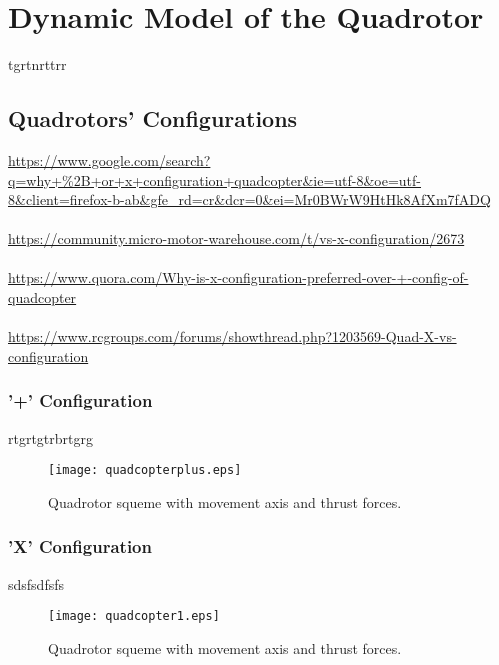 \chapter{Dynamic Model of the Quadrotor \label{ch:model}}
tgrtnrttrr
\section{Quadrotors' Configurations}
\url{https://www.google.com/search?q=why+\%2B+or+x+configuration+quadcopter&ie=utf-8&oe=utf-8&client=firefox-b-ab&gfe_rd=cr&dcr=0&ei=Mr0BWrW9HtHk8AfXm7fADQ}
\\\\
\url{https://community.micro-motor-warehouse.com/t/vs-x-configuration/2673}
\\\\
\url{https://www.quora.com/Why-is-x-configuration-preferred-over-+-config-of-quadcopter}
\\\\
\url{https://www.rcgroups.com/forums/showthread.php?1203569-Quad-X-vs-configuration}


\subsection{'+' Configuration}
rtgrtgtrbrtgrg
\begin{figure*}
\begin{center}
  \texttt{[image: quadcopterplus.eps]}
\caption{Quadrotor squeme with movement axis and thrust forces.} 
    \label{fig:quadcopterplus}
    \end{center}
\end{figure*}
\subsection{'X' Configuration}
sdsfsdfsfs
\begin{figure*}
\begin{center}
  \texttt{[image: quadcopter1.eps]}
\caption{Quadrotor squeme with movement axis and thrust forces.} 
    \label{fig:marcoreferencia}
    \end{center}
\end{figure*}

